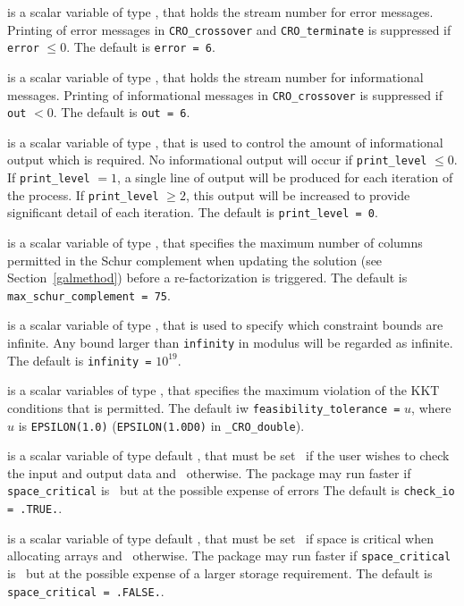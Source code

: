 \documentclass{galahad}
\newcommand{\packagename}{CRO}
\newcommand{\fullpackagename}{\libraryname\_\packagename}
\begin{document}
\begin{description}

 is a scalar variable of type \integer, that holds the
stream number for error messages. Printing of error messages in
{\tt \packagename\_crossover} and {\tt \packagename\_terminate}
is suppressed if
{\tt error} $\leq 0$.
The default is {\tt error = 6}.

 is a scalar variable of type \integer, that holds the
stream number for informational messages. Printing of informational messages in
{\tt \packagename\_crossover} is suppressed if {\tt out} $< 0$.
The default is {\tt out = 6}.

 is a scalar variable of type \integer, that is used
to control the amount of informational output which is required. No
informational output will occur if {\tt print\_level} $\leq 0$. If
{\tt print\_level} $= 1$, a single line of output will be produced for each
iteration of the process. If {\tt print\_level} $\geq 2$, this output will be
increased to provide significant detail of each iteration.
The default is {\tt print\_level = 0}.

 is a scalar variable of type \integer,
that specifies
the maximum number of columns permitted in the Schur complement when
updating the solution (see Section~\ref{galmethod})
before a re-factorization is triggered.
The default is {\tt max\_schur\_complement = 75}.

 is a scalar variable of type \realdp, that is used to
specify which constraint bounds are infinite.
Any bound larger than {\tt infinity} in modulus will be regarded as infinite.
The default is {\tt infinity =} $10^{19}$.

is a scalar variables of type \realdp, that specifies the
maximum violation of the KKT conditions that is permitted.
The default iw {\tt feasibility\_toler\-ance =} $u$,
where $u$ is {\tt EPSILON(1.0)} ({\tt EPSILON(1.0D0)} in
{\tt \fullpackagename\_double}).

 is a scalar variable of type default \logical,
that must be set \true\ if the user wishes to check the input and output
data and  \false\ otherwise. The package may run faster if
{\tt space\_critical} is \false\ but at the possible expense of errors
The default is {\tt check\_io = .TRUE.}.

 is a scalar variable of type default \logical,
that must be set \true\ if space is critical when allocating arrays
and  \false\ otherwise. The package may run faster if
{\tt space\_critical} is \false\ but at the possible expense of a larger
storage requirement. The default is {\tt space\_critical = .FALSE.}.


\end{description}
\end{document}
